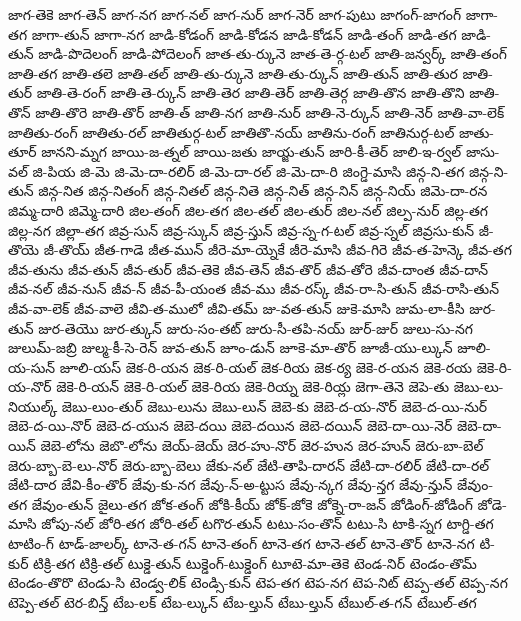 {జాగ-తెకె
జాగ-తెన్
జాగ-నగ
జాగ-నల్
జాగ-నుర్
జాగ-నెర్
జాగ-పుటు
జాగంగ్-జాగంగ్
జాగా-తగ
జాగా-తున్
జాగా-నగ
జాడి-కోడంగ్
జాడి-కోడన
జాడి-కోడన్
జాడి-తంగ్
జాడి-తగ
జాడి-తున్
జాడి-పొదెలంగ్
జాడి-పోదెలంగ్
జాత-తు-ర్కునె
జాత-తె-ర్గ-టల్
జాతి-జన్వర్క్
జాతి-తంగ్
జాతి-తగ
జాతి-తలె
జాతి-తల్
జాతి-తు-ర్కునె
జాతి-తు-ర్కున్
జాతి-తున్
జాతి-తుర
జాతి-తుర్
జాతి-తె-రంగ్
జాతి-తె-ర్కున్
జాతి-తెర
జాతి-తెర్
జాతి-తెర్గ
జాతి-తొన
జాతి-తొని
జాతి-తొన్
జాతి-తొరె
జాతి-తొర్
జాతి-త్
జాతి-నగ
జాతి-నుర్
జాతి-నె-ర్కున్
జాతి-నెర్
జాతి-వా-లెక్
జాతితు-రంగ్
జాతితు-రల్
జాతితుర్గ-టల్
జాతితొ-నయ్
జాతిను-రంగ్
జాతినుర్గ-టల్
జాతు-తూర్
జానని-మ్నగ
జాయి-జ-త్నల్
జాయి-జతు
జాయ్జ-తున్
జారి-కీ-తెర్
జాలి-ఇ-ర్వల్
జాసు-వల్
జి-పియ
జి-మె
జి-మె-దా-రలిర్
జి-మె-దా-రల్
జి-మె-దా-రి
జింగ్డె-మాసి
జిన్గ-ని-తగ
జిన్గ-ని-తున్
జిన్గ-నిత
జిన్గ-నితంగ్
జిన్గ-నితల్
జిన్గ-నితె
జిన్గ-నిత్
జిన్గ-నిన్
జిన్గ-నియ్
జిమె-దా-రన
జిమ్మ-దారి
జిమ్మె-దారి
జిల-తంగ్
జిల-తగ
జిల-తల్
జిల-తుర్
జిల-నల్
జిల్ప-నుర్
జిల్ల-తగ
జిల్ల-నగ
జిల్లా-తగ
జివ్ర-సున్
జివ్ర-స్కున్
జివ్ర-స్తున్
జివ్ర-స్న-గ-టల్
జివ్ర-స్నల్
జివ్రసు-కున్
జీ-తొయె
జీ-తొయ్
జీత-గాడె
జీత-మున్
జీరె-మా-య్నెకే
జీరె-మాసి
జీవ-గిరె
జీవ-త-హెన్కె
జీవ-తగ
జీవ-తును
జీవ-తున్
జీవ-తుర్
జీవ-తెకె
జీవ-తెన్
జీవ-తొర్
జీవ-తోరె
జీవ-దాంత
జీవ-దాన్
జీవ-నల్
జీవ-నున్
జీవ-న్
జీవ-పీ-యంత
జీవ-ము
జీవ-రస్క్
జీవ-రా-సి-తున్
జీవ-రాసి-తున్
జీవ-వా-లెక్
జీవ-వాలె
జీవి-త-ములో
జీవి-తమ్
జు-వత-తున్
జుకె-మాసి
జుమ-లా-కీసి
జుర-తున్
జుర-తెయొ
జుర-త్కున్
జురు-సం-తట్
జురు-సీ-తపి-నయ్
జుర్-జుర్
జులు-సు-నగ
జులుమ్-జబ్రి
జుల్మ-కీ-సె-రెన్
జువ-తున్
జూం-డున్
జూకె-మా-తొర్
జూజీ-యు-ల్కున్
జూలి-య-సున్
జూలి-యస్
జెక-రి-యన
జెక-రి-యల్
జెక-రియ
జెక-ర్య
జెకె-ర-యన
జెకె-రయ
జెకె-రి-య-నొర్
జెకె-రి-యన్
జెకె-రి-యల్
జెకె-రియ
జెకె-రియ్న
జెకె-రియ్ల
జెగా-తెనె
జెపె-తు
జెబు-లు-నియుల్క్
జెబు-లుం-తుర్
జెబు-లును
జెబు-లున్
జెబె-కు
జెబె-ద-య-నొర్
జెబె-ద-యి-నుర్
జెబె-ద-యి-నొర్
జెబె-ద-యున
జెబె-దయి
జెబె-దయిన
జెబె-దయిన్
జెబె-దా-యి-నెర్
జెబె-దా-యిన్
జెబె-లోను
జెబొ-లోను
జెయ్-జెయ్
జెర-హు-నొర్
జెర-హున
జెర-హున్
జెరు-బా-బెల్
జెరు-బ్బా-బె-లు-నొర్
జెరు-బ్బా-బెలు
జేకు-నల్
జేటి-తాపి-దారన్
జేటి-దా-రలిర్
జేటి-దా-రల్
జేటి-దార
జేవి-కీం-తొర్
జేవు-కు-నగ
జేవు-న్-అ-ట్టుస
జేవు-న్కగ
జేవు-న్తగ
జేవు-న్తున్
జేవుం-తగ
జేవుం-తున్
జైలు-తగ
జోక-తంగ్
జోకి-కీయ్
జోక్-జోకె
జోక్నె-రా-జన్
జోడింగ్-జోడింగ్
జోడె-మాసి
జోపు-నల్
జోరి-తగ
జోరి-తల్
టగొర-తున్
టటు-సం-తొన్
టటు-సి
టాకి-స్నగ
టాగ్డి-తగ
టాటిం-గ్
టాడ్-జాలర్క్
టానె-త-గన్
టానె-తంగ్
టానె-తగ
టానె-తల్
టానె-తొర్
టానె-నగ
టి-కుర్
టిక్రి-తగ
టిక్రి-తల్
టుక్డె-తున్
టుక్డెంగ్-టుక్డెంగ్
టూటె-మా-తెకె
టెండ-నిర్
టెండం-తొమ్
టెండం-తొరొ
టెండు-సి
టెండ్వ-లిక్
టెండ్సి-కున్
టెప-తగ
టెప-నగ
టెప-నిట్
టెప్ప-తల్
టెప్ప-నగ
టెప్పె-తల్
టెర-బిన్త్
టేబ-లక్
టేబ-ల్కున్
టేబ-ల్తున్
టేబు-ల్తున్
టేబుల్-త-గన్
టేబుల్-తగ
}
